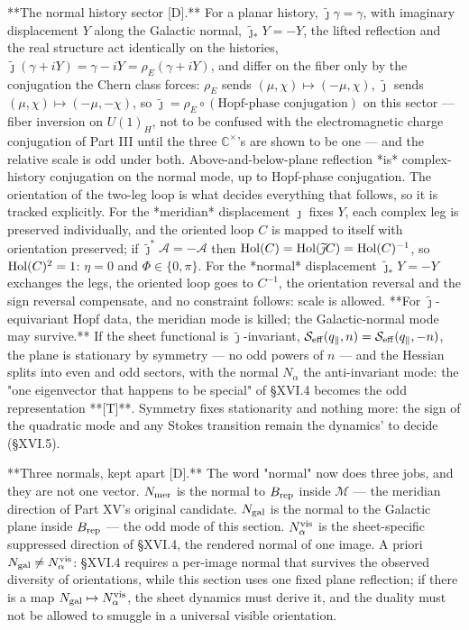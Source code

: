 **The normal history sector [D].** For a planar history, $\widetilde\jmath\gamma = \gamma$, with imaginary displacement $Y$ along the Galactic normal, $\widetilde\jmath_*Y = -Y$, the lifted reflection and the real structure act identically on the histories, $\widetilde\jmath(\gamma+iY) = \gamma-iY = \rho_E(\gamma+iY)$, and differ on the fiber only by the conjugation the Chern class forces: $\rho_E$ sends $(\mu,\chi)\mapsto(-\mu,\chi)$, $\widetilde\jmath$ sends $(\mu,\chi)\mapsto(-\mu,-\chi)$, so $\widetilde\jmath = \rho_E\circ(\text{Hopf-phase conjugation})$ on this sector — fiber inversion on $U(1)_H$, not to be confused with the electromagnetic charge conjugation of Part III until the three $\mathbb C^\times$'s are shown to be one — and the relative scale is odd under both. Above-and-below-plane reflection *is* complex-history conjugation on the normal mode, up to Hopf-phase conjugation. The orientation of the two-leg loop is what decides everything that follows, so it is tracked explicitly. For the *meridian* displacement $\jmath$ fixes $Y$, each complex leg is preserved individually, and the oriented loop $C$ is mapped to itself with orientation preserved; if $\widetilde\jmath^*\mathcal A = -\mathcal A$ then ${\rm Hol}(C) = {\rm Hol}(\widetilde\jmath C) = {\rm Hol}(C)^{-1}$, so ${\rm Hol}(C)^2 = 1$: $\eta = 0$ and $\Phi\in\{0,\pi\}$. For the *normal* displacement $\widetilde\jmath_*Y = -Y$ exchanges the legs, the oriented loop goes to $C^{-1}$, the orientation reversal and the sign reversal compensate, and no constraint follows: scale is allowed. **For $\widetilde\jmath$-equivariant Hopf data, the meridian mode is killed; the Galactic-normal mode may survive.** If the sheet functional is $\widetilde\jmath$-invariant, $\mathcal S_{\rm eff}(q_\parallel,n) = \mathcal S_{\rm eff}(q_\parallel,-n)$, the plane is stationary by symmetry — no odd powers of $n$ — and the Hessian splits into even and odd sectors, with the normal $N_\alpha$ the anti-invariant mode: the "one eigenvector that happens to be special" of §XVI.4 becomes the odd representation **[T]**. Symmetry fixes stationarity and nothing more: the sign of the quadratic mode and any Stokes transition remain the dynamics' to decide (§XVI.5).

**Three normals, kept apart [D].** The word "normal" now does three jobs, and they are not one vector. $N_{\rm mer}$ is the normal to $B_{\rm rep}$ inside $\mathcal M$ — the meridian direction of Part XV's original candidate. $N_{\rm gal}$ is the normal to the Galactic plane inside $B_{\rm rep}$ — the odd mode of this section. $N_\alpha^{\rm vis}$ is the sheet-specific suppressed direction of §XVI.4, the rendered normal of one image. A priori $N_{\rm gal}\neq N_\alpha^{\rm vis}$: §XVI.4 requires a per-image normal that survives the observed diversity of orientations, while this section uses one fixed plane reflection; if there is a map $N_{\rm gal}\mapsto N_\alpha^{\rm vis}$, the sheet dynamics must derive it, and the duality must not be allowed to smuggle in a universal visible orientation.

